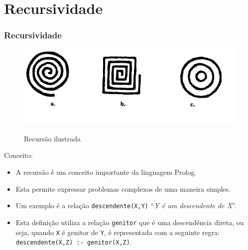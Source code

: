 \documentclass[sans]{beamer}
\begin{document}

\section{Recursividade} 
\begin{frame}[fragile]   %
\frametitle{Recursividade}

 
\begin{figure}[!htb]
\centering
\includegraphics[scale = 0.2]{figuras/recursividade_ilustra_1.pdf}
%
\label{fig_recursividade_ilustra_1}
\caption{Recursão ilustrada}
\end{figure}
 
   
\end{frame}








\begin{frame}
\begin{block}{Conceito:}
\begin{itemize}

\item A recursão é um conceito importante da linguagem Prolog.

\item Esta permite expressar problemas complexos de uma maneira simples.

\item Um exemplo  é a relação \texttt{descendente(X,Y)} ``\textit{Y é um descendente de X}''. 

\item Esta definição utiliza a relação \texttt{genitor} que é uma
descendência direta, ou seja, quando \texttt{X} é genitor de \texttt{Y}, 
é representada com a seguinte regra:\\

\texttt{descendente(X,Z) :- genitor(X,Z)}.

\end{itemize}
\end{block}   
\end{frame}
\end{document}

